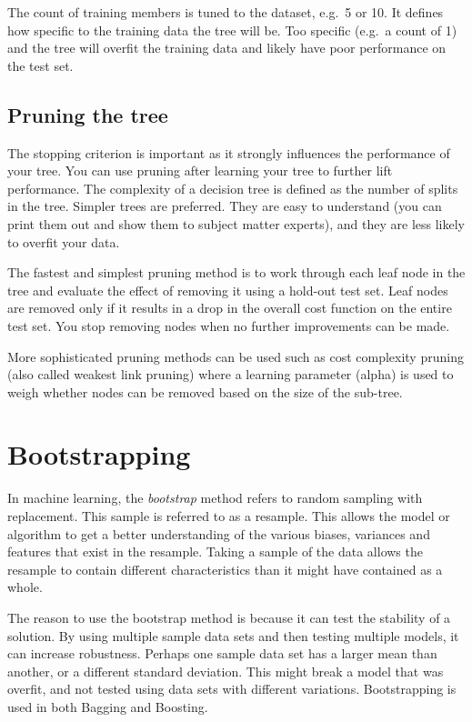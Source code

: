 \documentclass{article}
\begin{document}
The count of training members is tuned to the dataset, e.g.\ 5 or 10. It defines how specific to the training data the tree will be. Too specific (e.g.\ a count of 1) and the tree will overfit the training data and likely have poor performance on the test set.

\subsection{Pruning the tree}
The stopping criterion is important as it strongly influences the performance of your tree. You can use pruning after learning your tree to further lift performance.
The complexity of a decision tree is defined as the number of splits in the tree. Simpler trees are preferred. They are easy to understand (you can print them out and show them to subject matter experts), and they are less likely to overfit your data.

The fastest and simplest pruning method is to work through each leaf node in the tree and evaluate the effect of removing it using a hold-out test set. Leaf nodes are removed only if it results in a drop in the overall cost function on the entire test set. You stop removing nodes when no further improvements can be made.

More sophisticated pruning methods can be used such as cost complexity pruning (also called weakest link pruning) where a learning parameter (alpha) is used to weigh whether nodes can be removed based on the size of the sub-tree.

\section{Bootstrapping}
In machine learning, the \emph{bootstrap} method refers to random sampling with replacement. This sample is referred to as a resample. 
This allows the model or algorithm to get a better understanding of the various biases, variances and features that exist in the resample. Taking a sample of the data allows the resample to contain different characteristics than it might have contained as a whole.

The reason to use the bootstrap method is because it can test the stability of a solution. By using multiple sample data sets and then testing multiple models, it can increase robustness. Perhaps one sample data set has a larger mean than another, or a different standard deviation. This might break a model that was overfit, and not tested using data sets with different variations. Bootstrapping is used in both Bagging and Boosting.
\end{document}
